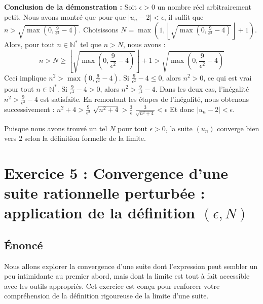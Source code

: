 \documentclass[a4paper,11pt]{report}
\begin{document}
\textbf{Conclusion de la démonstration :}
Soit $\epsilon > 0$ un nombre réel arbitrairement petit.
Nous avons montré que pour que $|u_n - 2| < \epsilon$, il suffit que $n > \sqrt{\max\left(0, \frac{9}{\epsilon^2} - 4\right)}$.
Choisissons $N = \max\left(1, \left\lfloor \sqrt{\max\left(0, \frac{9}{\epsilon^2} - 4\right)} \right\rfloor + 1\right)$.
Alors, pour tout $n \in \mathbb{N}^*$ tel que $n > N$, nous avons :
$$n > N \ge \left\lfloor \sqrt{\max\left(0, \frac{9}{\epsilon^2} - 4\right)} \right\rfloor + 1 > \sqrt{\max\left(0, \frac{9}{\epsilon^2} - 4\right)}$$
Ceci implique $n^2 > \max\left(0, \frac{9}{\epsilon^2} - 4\right)$.
Si $\frac{9}{\epsilon^2} - 4 \le 0$, alors $n^2 > 0$, ce qui est vrai pour tout $n \in \mathbb{N}^*$.
Si $\frac{9}{\epsilon^2} - 4 > 0$, alors $n^2 > \frac{9}{\epsilon^2} - 4$.
Dans les deux cas, l'inégalité $n^2 > \frac{9}{\epsilon^2} - 4$ est satisfaite.
En remontant les étapes de l'inégalité, nous obtenons successivement :
$n^2+4 > \frac{9}{\epsilon^2}$
$\sqrt{n^2+4} > \frac{3}{\epsilon}$
$\frac{3}{\sqrt{n^2+4}} < \epsilon$
Et donc $|u_n - 2| < \epsilon$.

Puisque nous avons trouvé un tel $N$ pour tout $\epsilon > 0$, la suite $(u_n)$ converge bien vers $2$ selon la définition formelle de la limite.

\vspace{1cm}

\section*{Exercice 5 : Convergence d'une suite rationnelle perturbée : application de la définition $(\epsilon, N)$}

\subsection*{Énoncé}

Nous allons explorer la convergence d'une suite dont l'expression peut sembler un peu intimidante au premier abord, mais dont la limite est tout à fait accessible avec les outils appropriés. Cet exercice est conçu pour renforcer votre compréhension de la définition rigoureuse de la limite d'une suite.
\end{document}
